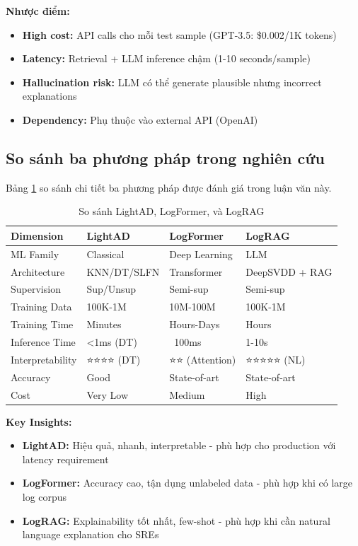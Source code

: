 \textbf{Nhược điểm:}
\begin{itemize}
    \item \textbf{High cost:} API calls cho mỗi test sample (GPT-3.5: \$0.002/1K tokens)
    \item \textbf{Latency:} Retrieval + LLM inference chậm (1-10 seconds/sample)
    \item \textbf{Hallucination risk:} LLM có thể generate plausible nhưng incorrect explanations
    \item \textbf{Dependency:} Phụ thuộc vào external API (OpenAI)
\end{itemize}

\subsection{So sánh ba phương pháp trong nghiên cứu}
\label{subsec:our-methods-comparison}

Bảng \ref{tab:methods-comparison} so sánh chi tiết ba phương pháp được đánh giá trong luận văn này.

\begin{table}[ht]
\centering
\caption{So sánh LightAD, LogFormer, và LogRAG}
\label{tab:methods-comparison}
\begin{tabular}{llll}
\hline
\textbf{Dimension} & \textbf{LightAD} & \textbf{LogFormer} & \textbf{LogRAG} \\
\hline
ML Family & Classical & Deep Learning & LLM \\
Architecture & KNN/DT/SLFN & Transformer & DeepSVDD + RAG \\
Supervision & Sup/Unsup & Semi-sup & Semi-sup \\
Training Data & 100K-1M & 10M-100M & 100K-1M \\
Training Time & Minutes & Hours-Days & Hours \\
Inference Time & <1ms (DT) & ~100ms & 1-10s \\
Interpretability & ⭐⭐⭐⭐ (DT) & ⭐⭐ (Attention) & ⭐⭐⭐⭐⭐ (NL) \\
Accuracy & Good & State-of-art & State-of-art \\
Cost & Very Low & Medium & High \\
\hline
\end{tabular}
\end{table}

\textbf{Key Insights:}
\begin{itemize}
    \item \textbf{LightAD:} Hiệu quả, nhanh, interpretable - phù hợp cho production với latency requirement
    \item \textbf{LogFormer:} Accuracy cao, tận dụng unlabeled data - phù hợp khi có large log corpus
    \item \textbf{LogRAG:} Explainability tốt nhất, few-shot - phù hợp khi cần natural language explanation cho SREs
\end{itemize}

